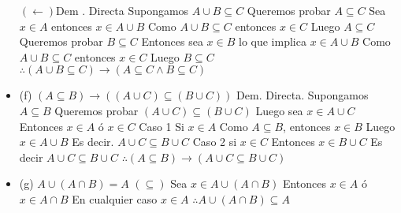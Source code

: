 \begin{itemize}
	$(\leftarrow)$Dem . Directa\newline
	Supongamos $A \cup B\subseteq C$\newline
	Queremos probar $A \subseteq C$\newline
	Sea $x \in A$ entonces $x \in A \cup B$\newline
	Como $A \cup B \subseteq C$ entonces $x \in C$\newline
	Luego $A \subseteq C$\newline
	Queremos probar $B \subseteq C$\newline
	Entonces sea $x \in B$ lo que implica $x \in A \cup B$\newline
	Como $A \cup B \subseteq C$ entonces $x \in C$\newline
	Luego $B \subseteq C$\newline
	$\therefore (A \cup B \subseteq C) \rightarrow (A \subseteq C \wedge B \subseteq C)$
	
	\item (f) $(A \subseteq B) \rightarrow ((A \cup C) \subseteq (B \cup C))$\newline
	Dem. Directa.\newline
	Supongamos $A \subseteq B$\newline
	Queremos probar $(A \cup C) \subseteq (B \cup C)$\newline
	Luego sea $x \in A \cup C$\newline
	Entonces $x \in A $ ó $x \in C$\newline
	Caso 1 Si $x \in A$\newline
	Como $A \subseteq B$, entonces $x \in B$\newline
	Luego $x \in A \cup B$\newline
	Es decir. $A \cup C \subseteq B \cup C$\newline
	Caso 2 si $x \in C$\newline
	Entonces $x \in B \cup C$\newline
	Es decir $A \cup C \subseteq B \cup C$\newline
	$\therefore (A \subseteq B) \rightarrow (A \cup C \subseteq B \cup C)$	
	
	\item (g) $A \cup (A \cap B) = A$\newline
	$(\subseteq)$\newline
	Sea $x \in A \cup (A \cap B)$\newline
	Entonces $x \in A$ ó $x \in A\cap B$\newline
	En cualquier caso $x \in A$\newline
	$\therefore A \cup (A \cap B) \subseteq A$\newline\\
	

\end{itemize}
